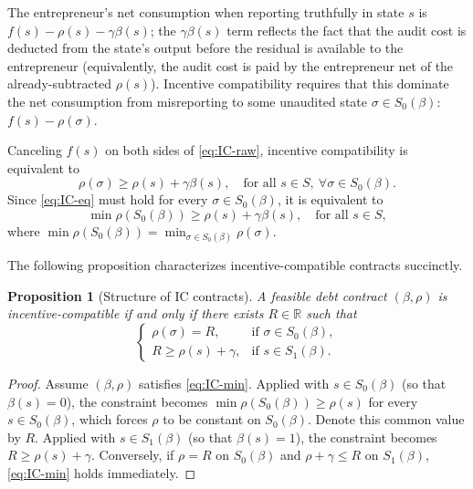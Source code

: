\documentclass[11pt,a4paper,oneside]{book}
\def\R{\mathbb{R}}
\def\leq{\leqslant}
\def\geq{\geqslant}
\theoremstyle{plain}
\newtheorem{proposition}[theorem]{Proposition}
\theoremstyle{definition}
\theoremstyle{remark}
\numberwithin{equation}{chapter}
\begin{document}
The entrepreneur's net consumption when reporting truthfully in state $s$ is $f(s) - \rho(s) - \gamma \beta(s)$; the $\gamma \beta(s)$ term reflects the fact that the audit cost is deducted from the state's output before the residual is available to the entrepreneur (equivalently, the audit cost is paid by the entrepreneur net of the already-subtracted $\rho(s)$).
Incentive compatibility requires that this dominate the net consumption from misreporting to some unaudited state $\sigma \in S_0(\beta)$: $f(s) - \rho(\sigma)$.

Canceling $f(s)$ on both sides of \eqref{eq:IC-raw}, incentive compatibility is equivalent to
\begin{equation}\label{eq:IC-eq}
  \rho(\sigma) \geq \rho(s) + \gamma \beta(s),
  \quad \text{for all $s\in S$}, \ \forall \sigma \in S_0(\beta).
\end{equation}
Since \eqref{eq:IC-eq} must hold for every $\sigma \in S_0(\beta)$, it is equivalent to
\begin{equation}\label{eq:IC-min}
  \min \rho(S_0(\beta)) \geq \rho(s) + \gamma \beta(s), \quad \text{for all $s\in S$},
  \tag{IC}
\end{equation}
where $\min \rho(S_0(\beta)) = \min_{\sigma \in S_0(\beta)} \rho(\sigma)$.

The following proposition characterizes incentive-compatible contracts succinctly.

\begin{proposition}[Structure of IC contracts]\label{prop:IC-structure}
A feasible debt contract $(\beta, \rho)$ is incentive-compatible if and only if there exists $R \in \R$ such that
\begin{equation*}
  \begin{cases}
    \rho(\sigma) = R, & \text{if } \sigma \in S_0(\beta), \\
    R \geq \rho(s) + \gamma, & \text{if } s \in S_1(\beta).
  \end{cases}
\end{equation*}
\end{proposition}

\begin{proof}
Assume $(\beta, \rho)$ satisfies \eqref{eq:IC-min}.
Applied with $s \in S_0(\beta)$ (so that $\beta(s) = 0$), the constraint becomes $\min \rho(S_0(\beta)) \geq \rho(s)$ for every $s \in S_0(\beta)$, which forces $\rho$ to be constant on $S_0(\beta)$.
Denote this common value by $R$.
Applied with $s \in S_1(\beta)$ (so that $\beta(s) = 1$), the constraint becomes $R \geq \rho(s) + \gamma$.
Conversely, if $\rho = R$ on $S_0(\beta)$ and $\rho + \gamma \leq R$ on $S_1(\beta)$, \eqref{eq:IC-min} holds immediately.
\end{proof}
\end{document}
